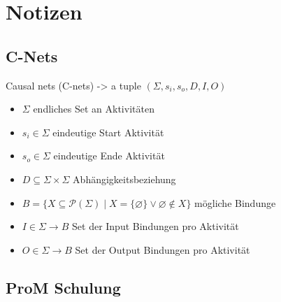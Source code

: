
\chapter{Notizen} %

\label{Notizen} %





\section{C-Nets}

Causal nets (C-nets) -> a tuple $(\Sigma, s_i , s_o , D, I, O)$\\

\begin{itemize}
\item{$\Sigma$ endliches Set an Aktivitäten}
\item{$s_i \in \Sigma$ eindeutige Start Aktivität}
\item{$s_o \in \Sigma$ eindeutige Ende Aktivität}
\item{$D \subseteq \Sigma \times \Sigma$ Abhängigkeitsbeziehung}
\item{$B = \{X \subseteq \mathscr{P} (\Sigma) \; \rvert \; X = \{ \varnothing \} \vee \varnothing \notin X \} $  mögliche Bindunge}
\item{$I \in \Sigma \rightarrow B$ Set der Input Bindungen pro Aktivität}
\item{$O \in \Sigma \rightarrow B$ Set der Output Bindungen pro Aktivität}

\end{itemize}


\pagebreak
\section{ProM Schulung}

